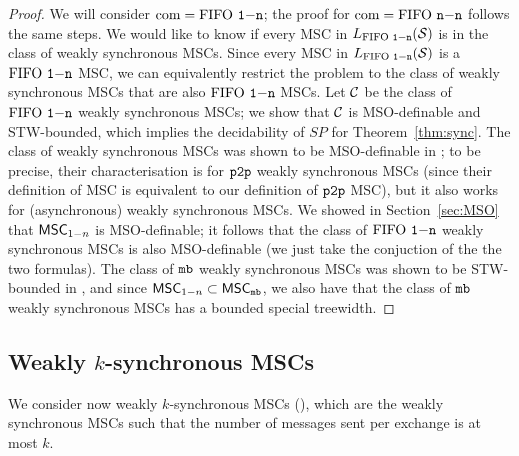 \begin{proof}

	We will consider $\textup{com} = \text{FIFO } \mathtt{1\mathsf{-}n}$; the proof for $\textup{com} = \text{FIFO } \mathtt{n\mathsf{-}n}$ follows the same steps. We would like to know if every MSC in $L_{\text{FIFO } \mathtt{1\mathsf{-}n}}(\mathcal{S})$ is in the class of weakly synchronous MSCs. Since every MSC in $L_{\text{FIFO } \mathtt{1\mathsf{-}n}}(\mathcal{S})$ is a $\text{FIFO } \mathtt{1\mathsf{-}n}$ MSC, we can equivalently restrict the problem to the class of weakly synchronous MSCs that are also $\text{FIFO } \mathtt{1\mathsf{-}n}$ MSCs. Let $\mathcal{C}$ be the class of $\text{FIFO } \mathtt{1\mathsf{-}n}$ weakly synchronous MSCs; we show that $\mathcal{C}$ is MSO-definable and STW-bounded, which implies the decidability of $SP$ for Theorem~\ref{thm:sync}. The class of weakly synchronous MSCs was shown to be MSO-definable in \cite{BolligGFLLS21}; to be precise, their characterisation is for $\mathtt{p2p}$ weakly synchronous MSCs (since their definition of MSC is equivalent to our definition of $\mathtt{p2p}$ MSC), but it also works for (asynchronous) weakly synchronous MSCs. We showed in Section~\ref{sec:MSO} that $\mathsf{MSC}_{1\mathsf{-}n}$ is MSO-definable; it follows that the class of $\text{FIFO } \mathtt{1\mathsf{-}n}$ weakly synchronous MSCs is also MSO-definable (we just take the conjuction of the the two formulas). The class of $\mathtt{mb}$ weakly synchronous MSCs was shown to be STW-bounded in \cite{BolligGFLLS21}, and since $\mathsf{MSC}_{1\mathsf{-}n} \subset \mathsf{MSC}_{\mathtt{mb}}$, we also have that the class of $\mathtt{mb}$ weakly synchronous MSCs has a bounded special treewidth. 
\end{proof}

\subsection{Weakly \texorpdfstring{$k$}{k}-synchronous MSCs}

We consider now weakly $k$-synchronous MSCs (\cite{BolligGFLLS21}), which are the weakly synchronous MSCs such that the number of messages sent per exchange is at most $k$.

